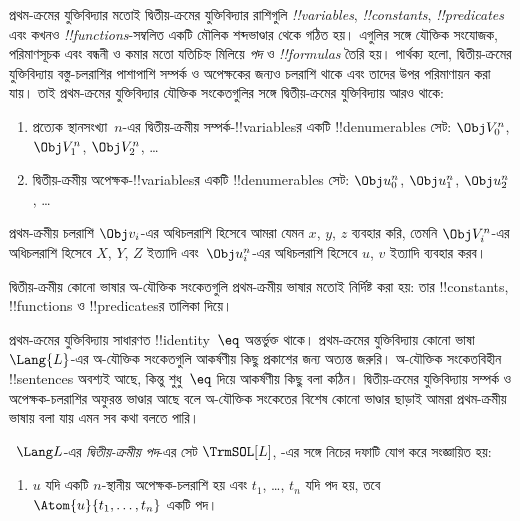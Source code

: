 \documentclass[../../../include/open-logic-section]{subfiles}
\begin{document}


প্রথম-ক্রমের যুক্তিবিদ্যার মতোই দ্বিতীয়-ক্রমের যুক্তিবিদ্যার রাশিগুলি
\emph{!!{variable}s}, \emph{!!{constant}s}, \emph{!!{predicate}s} এবং
কখনও \emph{!!{function}s}-সম্বলিত একটি মৌলিক শব্দভাণ্ডার থেকে গঠিত হয়।
এগুলির সঙ্গে যৌক্তিক সংযোজক, পরিমাণসূচক এবং বন্ধনী ও কমার মতো যতিচিহ্ন
মিলিয়ে \emph{পদ} ও \emph{!!{formula}s} তৈরি হয়। পার্থক্য হলো,
দ্বিতীয়-ক্রমের যুক্তিবিদ্যায় বস্তু-চলরাশির পাশাপাশি সম্পর্ক ও অপেক্ষকের
জন্যও চলরাশি থাকে এবং তাদের উপর পরিমাণায়ন করা যায়। তাই প্রথম-ক্রমের
যুক্তিবিদ্যার যৌক্তিক সংকেতগুলির সঙ্গে দ্বিতীয়-ক্রমের যুক্তিবিদ্যায় আরও
থাকে:

\begin{enumerate}
\item প্রত্যেক স্থানসংখ্যা~$n$-এর দ্বিতীয়-ক্রমীয় সম্পর্ক-!!{variable}sর
  একটি !!{denumerable}s সেট: $\Obj V_0^n$, $\Obj V_1^n$, $\Obj V_2^n$, \dots
\item দ্বিতীয়-ক্রমীয় অপেক্ষক-!!{variable}sর একটি !!{denumerable}s সেট:
  $\Obj u_0^n$, $\Obj u_1^n$, $\Obj u_2^n$, \dots
\end{enumerate}

প্রথম-ক্রমীয় চলরাশি $\Obj v_i$-এর অধিচলরাশি হিসেবে আমরা যেমন $x$,
$y$, $z$ ব্যবহার করি, তেমনি $\Obj V_i^n$-এর অধিচলরাশি হিসেবে $X$,
$Y$, $Z$ ইত্যাদি এবং~$\Obj u_i^n$-এর অধিচলরাশি হিসেবে $u$, $v$
ইত্যাদি ব্যবহার করব।

\begin{explain}
দ্বিতীয়-ক্রমীয় কোনো ভাষার অ-যৌক্তিক সংকেতগুলি প্রথম-ক্রমীয় ভাষার মতোই
নির্দিষ্ট করা হয়: তার !!{constant}s, !!{function}s ও !!{predicate}sর
তালিকা দিয়ে।

প্রথম-ক্রমের যুক্তিবিদ্যায় সাধারণত !!{identity}~$\eq$ অন্তর্ভুক্ত থাকে।
প্রথম-ক্রমের যুক্তিবিদ্যায় কোনো ভাষা~$\Lang{L}$-এর অ-যৌক্তিক সংকেতগুলি
আকর্ষণীয় কিছু প্রকাশের জন্য অত্যন্ত জরুরি। অ-যৌক্তিক সংকেতবিহীন
!!{sentence}s অবশ্যই আছে, কিন্তু শুধু~$\eq$ দিয়ে আকর্ষণীয় কিছু বলা
কঠিন। দ্বিতীয়-ক্রমের যুক্তিবিদ্যায় সম্পর্ক ও অপেক্ষক-চলরাশির অফুরন্ত
ভাণ্ডার আছে বলে অ-যৌক্তিক সংকেতের বিশেষ কোনো ভাণ্ডার ছাড়াই আমরা
প্রথম-ক্রমীয় ভাষায় বলা যায় এমন সব কথা বলতে পারি।
\end{explain}

\begin{defn}[দ্বিতীয়-ক্রমীয় পদ]
~$\Lang L$-এর \emph{দ্বিতীয়-ক্রমীয় পদ}-এর সেট $\TrmSOL[L]$,
-এর সঙ্গে নিচের দফাটি যোগ করে সংজ্ঞায়িত
হয়:
\begin{enumerate}
\item $u$ যদি একটি $n$-স্থানীয় অপেক্ষক-চলরাশি হয় এবং $t_1$, \dots,
  $t_n$ যদি পদ হয়, তবে $\Atom{u}{t_1, \ldots, t_n}$ একটি পদ।
\end{enumerate}
\end{defn}
\end{document}
